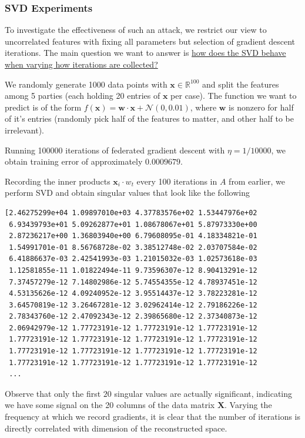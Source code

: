 \documentclass{article}
\begin{document}
\subsubsection{SVD Experiments}
To investigate the effectiveness of such an attack, we restrict our view to uncorrelated features with fixing all parameters but selection of gradient descent iterations.
The main question we want to answer is \uline{how does the SVD behave when varying how iterations are collected?}

We randomly generate 1000 data points with $\mathbf x\in\mathbb R^{100}$ and split the features among 5 parties (each holding 20 entries of $\mathbf x$ per case).
The function we want to predict is of the form $f(\mathbf x)=\mathbf w\cdot\mathbf x+\mathcal N(0,0.01)$, where $\mathbf w$ is nonzero for half of it's entries (randomly pick half of the features to matter, and other half to be irrelevant).

Running 100000 iterations of federated gradient descent with $\eta=1/10000$, we obtain training error of approximately $0.0009679$.


Recording the inner products $\mathbf x_i\cdot w_t$ every 100 iterations in $A$ from earlier, we perform SVD and obtain singular values that look like the following
\begin{verbatim}
[2.46275299e+04 1.09897010e+03 4.37783576e+02 1.53447976e+02
 6.93439793e+01 5.09262877e+01 1.08678067e+01 5.87973330e+00
 2.87236217e+00 1.36803940e+00 6.79608095e-01 4.18334821e-01
 1.54991701e-01 8.56768728e-02 3.38512748e-02 2.03707584e-02
 6.41886637e-03 2.42541993e-03 1.21015032e-03 1.02573618e-03
 1.12581855e-11 1.01822494e-11 9.73596307e-12 8.90413291e-12
 7.37457279e-12 7.14802986e-12 5.74554355e-12 4.78937451e-12
 4.53135626e-12 4.09240952e-12 3.95514437e-12 3.78223281e-12
 3.64570819e-12 3.26467281e-12 3.02962414e-12 2.79186226e-12
 2.78343760e-12 2.47092343e-12 2.39865680e-12 2.37340873e-12
 2.06942979e-12 1.77723191e-12 1.77723191e-12 1.77723191e-12
 1.77723191e-12 1.77723191e-12 1.77723191e-12 1.77723191e-12
 1.77723191e-12 1.77723191e-12 1.77723191e-12 1.77723191e-12
 1.77723191e-12 1.77723191e-12 1.77723191e-12 1.77723191e-12
 ...
\end{verbatim}

Observe that only the first $20$ singular values are actually significant, indicating we have some signal on the 20 columns of the data matrix $\mathbf X$.
Varying the frequency at which we record gradients, it is clear that the number of iterations is directly correlated with dimension of the reconstructed space.
\end{document}
